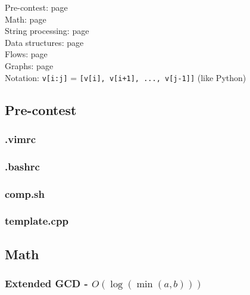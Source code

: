 \documentclass[landscape,a4paper,twocolumn,10pt]{report}
\begin{document}
\footnotesize

\noindent
Pre-contest: page \pageref{precontest} \\
Math: page \pageref{math} \\
String processing: page \pageref{string} \\
Data structures: page \pageref{datastruct} \\
Flows: page \pageref{flows} \\
Graphs: page \pageref{graphs} \\

\noindent
Notation: \verb#v[i:j]# = \verb#[v[i], v[i+1], ..., v[j-1]]# (like Python)

\subsection*{Pre-contest}
\label{precontest}

\subsubsection{.vimrc}


\subsubsection*{.bashrc}


\subsubsection*{comp.sh}


\subsubsection{template.cpp}




\subsection*{Math}
\label{math}

\subsubsection{Extended GCD - $O(\log(\min(a, b)))$}

\end{document}
